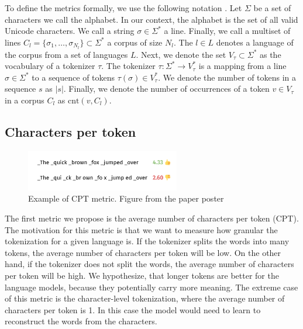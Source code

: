 To define the metrics formally, we use the following notation \cite{zouhar_tokenization_2023}. Let $\Sigma$ be a set of characters we call the alphabet. In our context, the alphabet is the set of all valid Unicode characters. We call a string $\sigma \in \Sigma^*$ a line. Finally, we call a multiset of lines $C_l = \{ \sigma_1, \ldots, \sigma_{N_l} \} \subset \Sigma^*$ a corpus of size $N_l$. The $l \in L$ denotes a language of the corpus from a set of languages $L$. Next, we denote the set $V_\tau \subset \Sigma^*$ as the vocabulary of a tokenizer $\tau$. The tokenizer $\tau: \Sigma^* \rightarrow V_\tau^*$ is a mapping from a line $\sigma \in \Sigma^*$ to a sequence of tokens $\tau(\sigma) \in V_\tau^*$. We denote the number of tokens in a sequence $s$ as $|s|$. Finally, we denote the number of occurrences of a token $v \in V_\tau$ in a corpus $C_l$ as $\textrm{cnt}(v, C_l)$.


\subsection{Characters per token}

\begin{figure}[h]
    \centering
    \includegraphics[width=0.6\textwidth]{img/temp/cpt_example.png}
    \caption{Example of CPT metric. Figure from the paper poster \cite{limisiewicz_tokenization_2023}}
    \label{fig:cpt_example}
\end{figure}

The first metric we propose is the average number of characters per token (CPT). The motivation for this metric is that we want to measure how granular the tokenization for a given language is. If the tokenizer splits the words into many tokens, the average number of characters per token will be low. On the other hand, if the tokenizer does not split the words, the average number of characters per token will be high. We hypothesize, that longer tokens are better for the language models, because they potentially carry more meaning. The extreme case of this metric is the character-level tokenization, where the average number of characters per token is 1. In this case the model would need to learn to reconstruct the words from the characters.

